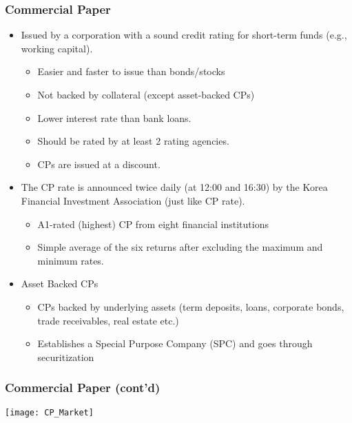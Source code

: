 \documentclass[10pt]{beamer}
\begin{document}
	
	
	
	\begin{frame}
		\frametitle{Commercial Paper}
		
		\begin{itemize} 
			\item Issued by a corporation with a sound
			credit rating for short-term funds (e.g., working capital). 
			
			\begin{itemize}
				\item Easier and faster to issue than bonds/stocks
				\item Not backed by collateral (except asset-backed
				CPs)
				\item Lower interest rate than bank loans.
				\item Should be rated by at least 2 rating agencies.
				\item CPs are issued at a discount.
			\end{itemize}		
			
			\item The CP rate is announced twice daily (at 12:00
			and 16:30) by the Korea Financial Investment Association (just like CP rate).
			\begin{itemize}
				\item A1-rated (highest) CP from eight financial institutions
				\item Simple average of the six returns after excluding the maximum and minimum rates.
			\end{itemize}
			
			\item Asset Backed CPs
			\begin{itemize}
				\item CPs backed by underlying assets (term deposits, loans, corporate bonds, trade receivables, real estate etc.)
				\item Establishes a Special Purpose Company (SPC) and goes through securitization 
			\end{itemize}
			
		\end{itemize}		
		
	\end{frame}
	
	
	\begin{frame}
		\frametitle{Commercial Paper (cont'd)} %
		\begin{center}
			\texttt{[image: CP\_Market]}
		\end{center}
		
	\end{frame}
	
\end{document}
